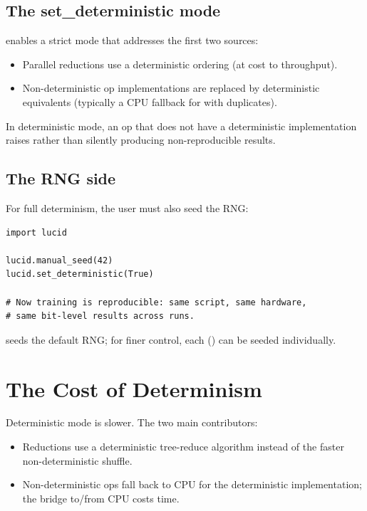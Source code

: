 \subsection{The set\_deterministic mode}
\label{ssec:profiler_determinism:set_det}

 enables a strict mode that
addresses the first two sources:

\begin{itemize}
  \item Parallel reductions use a deterministic ordering (at
    cost to throughput).
  \item Non-deterministic op implementations are replaced by
    deterministic equivalents (typically a CPU fallback for
     with duplicates).
\end{itemize}

In deterministic mode, an op that does not have a deterministic
implementation raises  rather than silently
producing non-reproducible results.

\subsection{The RNG side}
\label{ssec:profiler_determinism:rng}

For full determinism, the user must also seed the RNG:

\begin{lstlisting}[style=lucid,language=LucidPython]
import lucid

lucid.manual_seed(42)
lucid.set_deterministic(True)

# Now training is reproducible: same script, same hardware,
# same bit-level results across runs.
\end{lstlisting}

 seeds the default RNG; for finer control,
each  () can be seeded
individually.

\section{The Cost of Determinism}
\label{sec:profiler_determinism:cost}

Deterministic mode is slower. The two main contributors:

\begin{itemize}
  \item Reductions use a deterministic tree-reduce algorithm
    instead of the faster non-deterministic shuffle.
  \item Non-deterministic ops fall back to CPU for the
    deterministic implementation; the bridge to/from CPU costs
    time.
\end{itemize}

